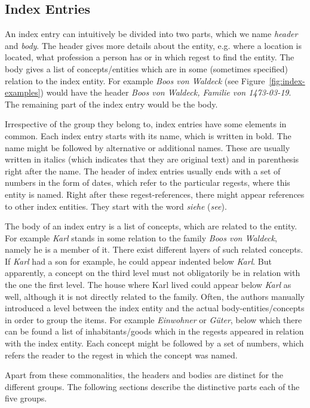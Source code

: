 \subsection{Index Entries}
An index entry can intuitively be divided into two parts, which we
name \textit{header} and \textit{body}. The header gives more details
about the entity, e.g. where a location is located, what profession a
person has or in which regest to find the entity. The body gives a
list of concepts/entities which are in some (sometimes specified)
relation to the index entity. For example \textit{Boos von Waldeck}
(see Figure~\ref{fig:index-examples}) would have the header
\textit{Boos von Waldeck, Familie von 1473-03-19}. The remaining part
of the index entry would be the body.

Irrespective of the group they belong to, index entries have some
elements in common. Each index entry starts with its name, which is
written in bold. The name might be followed by alternative or
additional names. These are usually written in italics (which
indicates that they are original text) and in parenthesis right after
the name. The header of index entries usually ends with a set of
numbers in the form of dates, which refer to the particular regests,
where this entity is named. Right after these regest-references, there
might appear references to other index entities. They start with the
word \textit{siehe} (\textit{see}).

The body of an index entry is a list of concepts, which are related to
the entity. For example \textit{Karl} stands in some relation to the
family \textit{Boos von Waldeck}, namely he is a member of it. There
exist different layers of such related concepts. If \textit{Karl} had
a son for example, he could appear indented below \textit{Karl}. But
apparently, a concept on the third level must not obligatorily be in
relation with the one the first level. The house where Karl lived
could appear below \textit{Karl} as well, although it is not directly
related to the family. Often, the authors manually introduced a level
between the index entity and the actual body-entities/concepts in
order to group the items. For example \textit{Einwohner} or
\textit{Güter}, below which there can be found a list of
inhabitants/goods which in the regests appeared in relation with the
index entity. Each concept might be followed by a set of numbers,
which refers the reader to the regest in which the concept was named.

Apart from these commonalities, the headers and bodies are distinct
for the different groups. The following sections describe the
distinctive parts each of the five groups.

